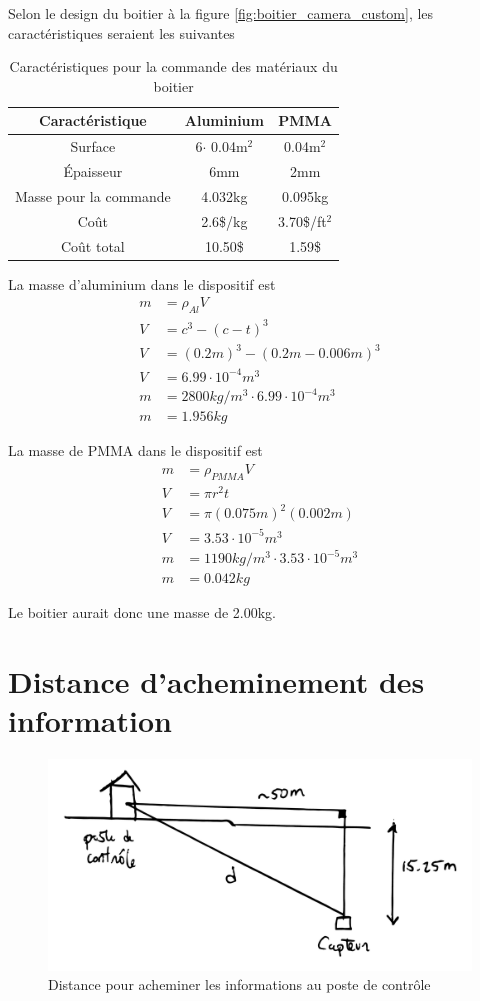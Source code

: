 Selon le design du boitier à la figure \ref{fig:boitier_camera_custom}, les caractéristiques seraient les suivantes 

\begin{table}[!htb]
\footnotesize
\centering
    \begin{tabular}{|c|c|c|}
    \hline
    Caractéristique & Aluminium & PMMA\\
    \hline\hline
    Surface & 6$\cdot$ 0.04m$^2$ & 0.04m$^2$\\
    Épaisseur & 6mm & 2mm\\
    Masse pour la commande & 4.032kg & 0.095kg\\
    Coût & 2.6\$/kg & 3.70\$/ft$^2$ \\
    \hline
    Coût total & 10.50\$ & 1.59\$ \\
    \hline
    \end{tabular}
\caption{Caractéristiques pour la commande des matériaux du boitier \cite{PMMA_cout} \cite{Aluminium_cout}}
\label{t:commande_boitier}
\end{table}

La masse d'aluminium dans le dispositif est
\begin{align}
    m &= \rho_{Al} V\\
    V &= c^3 - (c-t)^3\\
    V &= (0.2m)^3 - (0.2m - 0.006m)^3\\
    V &= 6.99 \cdot 10^{-4} m^3\\
    m &= 2800 kg/m^3 \cdot 6.99 \cdot 10^{-4}m^3\\
    m &= 1.956 kg
\end{align}

La masse de PMMA dans le dispositif est
\begin{align}
    m &= \rho_{PMMA} V\\
    V &= \pi r^2 t\\
    V &= \pi (0.075m)^2 (0.002m)\\
    V &= 3.53 \cdot 10^{-5} m^3\\
    m &= 1190 kg/m^3 \cdot 3.53 \cdot 10^{-5} m^3\\
    m &= 0.042 kg
\end{align}

Le boitier aurait donc une masse de 2.00kg.


\chapter{Distance d'acheminement des information}

\begin{figure}[!htb]
    \centering
    \includegraphics[width=0.5\linewidth]{fig/distance_min.png}
    \caption{Distance pour acheminer les informations au poste de contrôle}
    \label{fig:distance_acheminer}
\end{figure}
